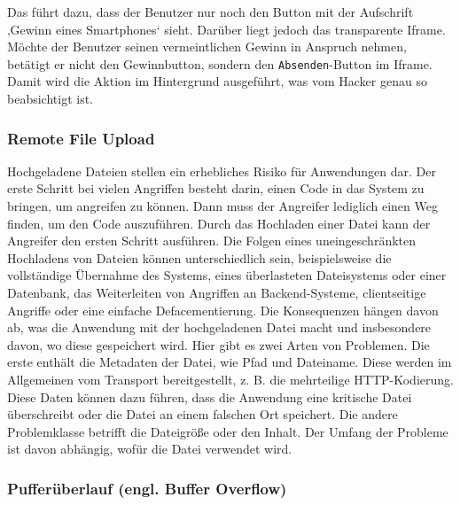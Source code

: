 Das führt dazu, dass der Benutzer nur noch den Button mit der Aufschrift ‚Gewinn eines Smartphones‘ sieht. Darüber liegt jedoch das transparente Iframe. Möchte der Benutzer seinen vermeintlichen Gewinn in Anspruch nehmen, betätigt er nicht den Gewinnbutton, sondern den \texttt{Absenden}-Button im Iframe. Damit wird die Aktion im Hintergrund ausgeführt, was vom Hacker genau so beabsichtigt  ist\cite{cjd13}.\\

\subsubsection{Remote File Upload}

Hochgeladene Dateien stellen ein erhebliches Risiko für Anwendungen dar. Der erste Schritt bei vielen Angriffen besteht darin, einen Code in das System zu bringen, um angreifen zu können. Dann muss der Angreifer lediglich einen Weg finden, um den Code auszuführen. Durch das Hochladen einer Datei kann der Angreifer den ersten Schritt ausführen. Die Folgen eines uneingeschränkten Hochladens von Dateien können unterschiedlich sein, beispielsweise die vollständige Übernahme des Systems, eines überlasteten Dateisystems oder einer Datenbank, das Weiterleiten von Angriffen an Backend-Systeme, clientseitige Angriffe oder eine einfache Defacementierung. Die Konsequenzen hängen davon ab, was die Anwendung mit der hochgeladenen Datei macht und insbesondere davon, wo diese gespeichert wird. Hier gibt es zwei Arten von Problemen. Die erste enthält die Metadaten der Datei, wie Pfad und Dateiname. Diese werden im Allgemeinen vom Transport bereitgestellt, z. B. die mehrteilige HTTP-Kodierung. Diese Daten können dazu führen, dass die Anwendung eine kritische Datei überschreibt oder die Datei an einem falschen Ort speichert. Die andere Problemklasse betrifft die Dateigröße oder den Inhalt. Der Umfang der Probleme ist davon abhängig, wofür die Datei verwendet wird\cite{fileremotevul18}. \\

\subsubsection{Pufferüberlauf (engl. Buffer Overflow)}

